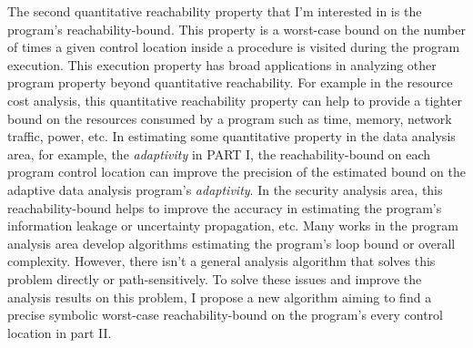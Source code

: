 

The second quantitative reachability property that I'm interested in is the program's reachability-bound.
This property is a worst-case bound on the number of times a given control location 
 inside a procedure is visited during the program execution.
This execution property has broad
applications in analyzing other program property beyond quantitative reachability.
For example in the resource cost analysis, this quantitative reachability property
can help to provide a tighter
bound on the resources consumed by a program such as time, memory,
network traffic, power, etc.
In estimating some quantitative property
in the data analysis area, for example, the \emph{adaptivity}
in PART I, the reachability-bound on each program control location
can improve the precision of the estimated bound on the adaptive data analysis program's \emph{adaptivity}.
In the security analysis area, this reachability-bound helps to improve the accuracy
in estimating the program's information leakage or uncertainty propagation, etc.
Many works in the program analysis area develop algorithms estimating the program's loop bound or overall complexity.
However, there isn't a general analysis algorithm that solves this problem directly or path-sensitively.
To solve these issues and improve the analysis results on this problem, I propose a new algorithm
aiming to find a precise symbolic worst-case reachability-bound on the program's every control location
in part II.



